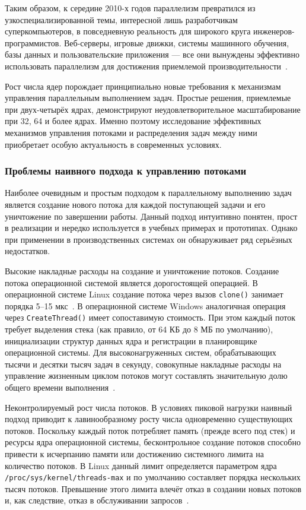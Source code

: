 Таким образом, к середине 2010-х годов параллелизм превратился из узкоспециализированной темы, интересной лишь разработчикам суперкомпьютеров, в повседневную реальность для широкого круга инженеров-программистов. Веб-серверы, игровые движки, системы машинного обучения, базы данных и пользовательские приложения --- все они вынуждены эффективно использовать параллелизм для достижения приемлемой производительности~\cite{Herlihy2020}.

Рост числа ядер порождает принципиально новые требования к механизмам управления параллельным выполнением задач. Простые решения, приемлемые при двух-четырёх ядрах, демонстрируют неудовлетворительное масштабирование при 32, 64 и более ядрах. Именно поэтому исследование эффективных механизмов управления потоками и распределения задач между ними приобретает особую актуальность в современных условиях.

\subsubsection{Проблемы наивного подхода к управлению потоками}
\label{subsubsec:problems-of-the-naive-approach}

Наиболее очевидным и простым подходом к параллельному выполнению задач является создание нового потока для каждой поступающей задачи и его уничтожение по завершении работы. Данный подход интуитивно понятен, прост в реализации и нередко используется в учебных примерах и прототипах. Однако при применении в производственных системах он обнаруживает ряд серьёзных недостатков.

Высокие накладные расходы на создание и уничтожение потоков. Создание потока операционной системой является дорогостоящей операцией. В операционной системе Linux создание потока через вызов \texttt{clone()} занимает порядка 5--15 мкс~\cite{Drepper2003}. В операционной системе Windows аналогичная операция через \texttt{CreateThread()} имеет сопоставимую стоимость. При этом каждый поток требует выделения стека (как правило, от 64 КБ до 8 МБ по умолчанию), инициализации структур данных ядра и регистрации в планировщике операционной системы. Для высоконагруженных систем, обрабатывающих тысячи и десятки тысяч задач в секунду, совокупные накладные расходы на управление жизненным циклом потоков могут составлять значительную долю общего времени выполнения~\cite{Butenhof1997}.

Неконтролируемый рост числа потоков. В условиях пиковой нагрузки наивный подход приводит к лавинообразному росту числа одновременно существующих потоков. Поскольку каждый поток потребляет память (прежде всего под стек) и ресурсы ядра операционной системы, бесконтрольное создание потоков способно привести к исчерпанию памяти или достижению системного лимита на количество потоков. В Linux данный лимит определяется параметром ядра \texttt{/proc/sys/kernel/threads-max} и по умолчанию составляет порядка нескольких тысяч потоков. Превышение этого лимита влечёт отказ в создании новых потоков и, как следствие, отказ в обслуживании запросов~\cite{Love2013}.


